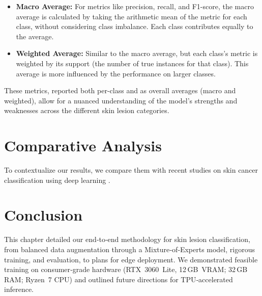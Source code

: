 \begin{itemize}
    \item \textbf{Macro Average:} For metrics like precision, recall, and F1-score, the macro average is calculated by taking the arithmetic mean of the metric for each class, without considering class imbalance. Each class contributes equally to the average.

    \item \textbf{Weighted Average:} Similar to the macro average, but each class's metric is weighted by its support (the number of true instances for that class). This average is more influenced by the performance on larger classes.

\end{itemize}

These metrics, reported both per-class and as overall averages (macro and weighted), allow for a nuanced understanding of the model's strengths and weaknesses across the different skin lesion categories.

\section{Comparative Analysis}
To contextualize our results, we compare them with recent studies on skin cancer classification using deep learning \cite{brinker2020comparative,lecun2015deep,krizhevsky2012imagenet,litjens2017survey}.

\section{Conclusion}
This chapter detailed our end‑to‑end methodology for skin lesion classification, from balanced data augmentation through a Mixture‑of‑Experts model, rigorous training, and evaluation, to plans for edge deployment. We demonstrated feasible training on consumer‑grade hardware (RTX 3060 Lite, 12 GB VRAM; 32 GB RAM; Ryzen 7 CPU) and outlined future directions for TPU‑accelerated inference.


